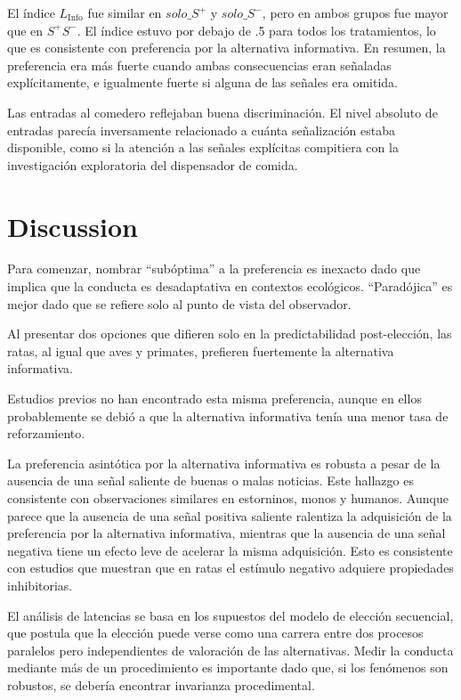 \documentclass[a4paper,12pt]{article}
\begin{document}
El índice $L_{\mbox{Info}}$ fue similar en $solo\_S^{+}$ y $solo\_S^{-}$, pero en ambos grupos fue mayor que en $S^{+}S^{-}$. El índice estuvo por debajo de .5 para todos los tratamientos, lo que es consistente con preferencia por la alternativa informativa. En resumen, la preferencia era más fuerte cuando ambas consecuencias eran señaladas explícitamente, e igualmente fuerte si alguna de las señales era omitida.

Las entradas al comedero reflejaban buena discriminación. El nivel absoluto de entradas parecía inversamente relacionado a cuánta señalización estaba disponible, como si la atención a las señales explícitas compitiera con la investigación exploratoria del dispensador de comida.

\section{Discussion}\label{discussion}

Para comenzar, nombrar ``subóptima'' a la preferencia es inexacto dado que implica que la conducta es desadaptativa en contextos ecológicos. ``Paradójica'' es mejor dado que se refiere solo al punto de vista del observador.

Al presentar dos opciones que difieren solo en la predictabilidad post-elección, las ratas, al igual que aves y primates, prefieren fuertemente la alternativa informativa.

Estudios previos no han encontrado esta misma preferencia, aunque en ellos probablemente se debió a que la alternativa informativa tenía una menor tasa de reforzamiento.

La preferencia asintótica por la alternativa informativa es robusta a pesar de la ausencia de una señal saliente de buenas o malas noticias. Este hallazgo es consistente con observaciones similares en estorninos, monos y humanos. Aunque parece que la ausencia de una señal positiva saliente ralentiza la adquisición de la preferencia por la alternativa informativa, mientras que la ausencia de una señal negativa tiene un efecto leve de acelerar la misma adquisición. Esto es consistente con estudios que muestran que en ratas el estímulo negativo adquiere propiedades inhibitorias.

El análisis de latencias se basa en los supuestos del modelo de elección secuencial, que postula que la elección puede verse como una carrera entre dos procesos paralelos pero independientes de valoración de las alternativas. Medir la conducta mediante más de un procedimiento es importante dado que, si los fenómenos son robustos, se debería encontrar invarianza procedimental.
\end{document}
